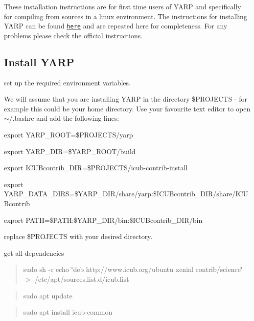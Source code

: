 These installation instructions are for first time users of Y\+A\+RP and specifically for compiling from sources in a linux environment. The instructions for installing Y\+A\+RP can be found \href{http://wiki.icub.org/wiki/Linux:Installation_from_sources}{\tt here} and are repeated here for completeness. For any problems please check the official instructions.

\subsection*{Install Y\+A\+RP}

set up the required environment variables.

We will assume that you are installing Y\+A\+RP in the directory \$\+P\+R\+O\+J\+E\+C\+TS -\/ for example this could be your home directory. Use your favourite text editor to open $\sim$/.bashrc and add the following lines\+:


\begin{DoxyItemize}
\item export Y\+A\+R\+P\+\_\+\+R\+O\+OT=\$\+P\+R\+O\+J\+E\+C\+TS/yarp
\item export Y\+A\+R\+P\+\_\+\+D\+IR=\$\+Y\+A\+R\+P\+\_\+\+R\+O\+OT/build
\item export I\+C\+U\+Bcontrib\+\_\+\+D\+IR=\$\+P\+R\+O\+J\+E\+C\+TS/icub-\/contrib-\/install
\item export Y\+A\+R\+P\+\_\+\+D\+A\+T\+A\+\_\+\+D\+I\+RS=\$\+Y\+A\+R\+P\+\_\+\+D\+IR/share/yarp\+:\$\+I\+C\+U\+Bcontrib\+\_\+\+D\+IR/share/\+I\+C\+U\+Bcontrib
\item export P\+A\+TH=\$\+P\+A\+TH\+:\$\+Y\+A\+R\+P\+\_\+\+D\+IR/bin\+:\$\+I\+C\+U\+Bcontrib\+\_\+\+D\+IR/bin
\end{DoxyItemize}

replace \$\+P\+R\+O\+J\+E\+C\+TS with your desired directory.

get all dependencies

\begin{quote}
sudo sh -\/c \textquotesingle{}echo \char`\"{}deb http\+://www.\+icub.\+org/ubuntu xenial contrib/science\char`\"{} $>$ /etc/apt/sources.list.\+d/icub.list\textquotesingle{} \end{quote}


\begin{quote}
sudo apt update \end{quote}


\begin{quote}
sudo apt install icub-\/common \end{quote}


